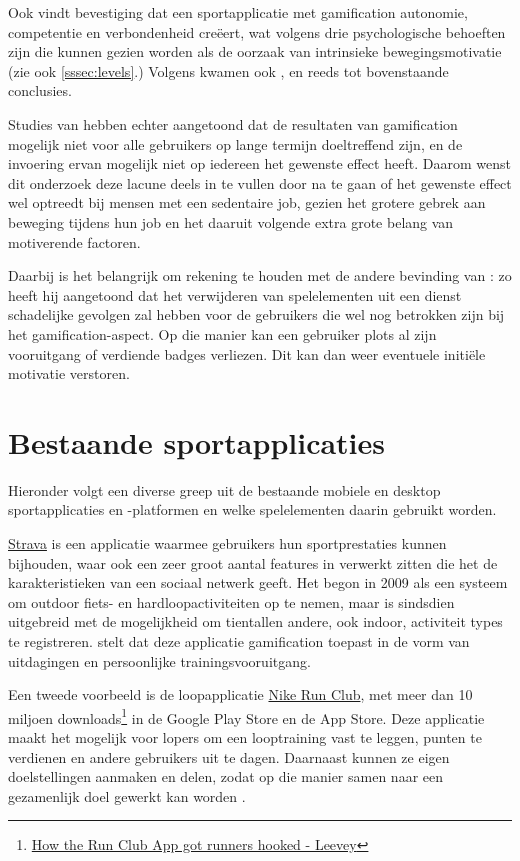 Ook \textcite{Bitrian2020} vindt bevestiging dat een sportapplicatie met gamification autonomie, competentie en verbondenheid creëert, wat volgens \textcite{ManzanoLeon2021} drie psychologische behoeften zijn die kunnen gezien worden als de oorzaak van intrinsieke bewegingsmotivatie (zie ook \ref{sssec:levels}.) Volgens \textcite{Tu2019} kwamen ook \textcite{Lewis2016}, \textcite{Liu2017} en \textcite{Tabak2015} reeds tot bovenstaande conclusies.

Studies van \textcite{Hamari2013a} hebben echter aangetoond dat de resultaten van gamification mogelijk niet voor alle gebruikers op lange termijn doeltreffend zijn, en de invoering ervan mogelijk niet op iedereen het gewenste effect heeft. Daarom wenst dit onderzoek deze lacune deels in te vullen door na te gaan of het gewenste effect wel optreedt bij mensen met een sedentaire job, gezien het grotere gebrek aan beweging tijdens hun job en het daaruit volgende extra grote belang van motiverende factoren.

Daarbij is het belangrijk om rekening te houden met de andere bevinding van \textcite{Hamari2013a}: zo heeft hij aangetoond dat het verwijderen van spelelementen uit een dienst schadelijke gevolgen zal hebben voor de gebruikers die wel nog betrokken zijn bij het gamification-aspect. Op die manier kan een gebruiker plots al zijn vooruitgang of verdiende badges verliezen. Dit kan dan weer eventuele initiële motivatie verstoren.

\section{Bestaande sportapplicaties}
Hieronder volgt een diverse greep uit de bestaande mobiele en desktop sportapplicaties en -platformen en welke spelelementen daarin gebruikt worden.

\href{https://www.strava.com/}{Strava} is een applicatie waarmee gebruikers hun sportprestaties kunnen bijhouden, waar ook een zeer groot aantal features in verwerkt zitten die het de karakteristieken van een sociaal netwerk geeft. Het begon in 2009 als een systeem om outdoor fiets- en hardloopactiviteiten op te nemen, maar is sindsdien uitgebreid met de mogelijkheid om tientallen andere, ook indoor, activiteit types te registreren. \textcite{Barratt2017} stelt dat deze applicatie gamification toepast in de vorm van uitdagingen en persoonlijke trainingsvooruitgang.

Een tweede voorbeeld is de loopapplicatie \href{https://www.nike.com/be/en/nrc-app}{Nike Run Club}, met meer dan 10 miljoen downloads\footnote{\href{https://bootcamp.uxdesign.cc/how-the-nike-run-club-app-got-runners-hooked-2850c7654fc5}{How the Run Club App got runners hooked - Leevey}} in de Google Play Store en de App Store. Deze applicatie maakt het mogelijk voor lopers om een looptraining vast te leggen, punten te verdienen en andere gebruikers uit te dagen. Daarnaast kunnen ze eigen doelstellingen aanmaken en delen, zodat op die manier samen naar een gezamenlijk doel gewerkt kan worden \autocite{StaalnackeLarsson2013}.

